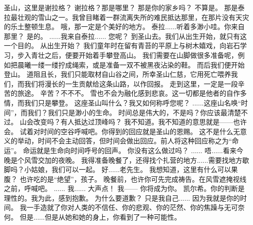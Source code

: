 \documentclass[openany]{book}
\begin{document}
\begin{dialogue}
     圣山，这里是谢拉格？
     谢拉格？那是哪里？
     那是你的家乡吗？
     不算是。
     那是泰拉最壮观的雪山之一。我曾目睹着一群流离失所的难民抵达那里，在那片没有天灾的乐土整顿生息。
     哦，那一定是个美好的地方。
     泰拉......听着多渺小哇。你来自那里？
     是的。
     ......我来自泰拉......
     您呢？
     到圣山去。我们从出生开始，就只有这一个目的。
     从出生开始？
     我们童年时在留有青苔的平原上与树木嬉戏，向岩石学习，步入青壮之后，便要开始着手攀登高山。
     我们需要在山脚做很多准备呢，例如把晨曦一缕一缕拧成绳索，或是准备一双不被黑夜沾染的鞋。
     而后我们便开始登山。
     道阻且长，我们只能取材自山谷之间，所幸圣山仁慈，它用死亡喂养我们，而我们将漫长的一生贡献给这条山路，以作回报。
     走到这里，一定是一段辛苦的旅途。
     辛苦？不不不。
     雪也不会为融化感到悲哀。这一切都是他者的自作多情，而我们只是攀登。
     这座圣山叫什么？我又如何称呼您呢？
     ......这座山名唤“时间”，而我们？我们只是渺小的生命。
     时间总是伟大的，不是吗？你应该最清楚不过。
     山会改变吗？有人抵达过顶峰吗？
     我不知道。我不知道的意思就是——也许会。
     试着对时间的空谷呼喊吧。你得到的回应就是圣山的恩赐。
     这不是什么无意义的举动，时间不会主动回答，但时间会做出回应。前人将这种回应称之为“命运”。
     命运就是生命向时间呼号的回声。
     你没有这么做过吗？
     ......
     唔......看来今晚是个风雪交加的夜晚。
     我得准备晚餐了，还得找个扎营的地方......需要找地方歇脚吗？小姑娘，我们可以一起。
     好......老先生。
     我想知道，这里有什么可以果腹？
     也许吃的是“绝望”，孩子。
     晚餐前，也许你可先完成祷告。在风雪遮掩视线之前，呼喊吧。
     ......
     我......
     大声点！
     我——
     你将成为你。
     凯尔希。你的判断是理性的。我为此，感到抱歉。
     为什么要道歉？
     只是我自己......
     因为我就是你的时间。
     我一手造就了你对人类的不信任、你的悲观、你的茫然、你的焦躁与无可奈何。
     但是......但是从她和她的身上，你看到了一种可能性。

\end{dialogue}
\end{document}
